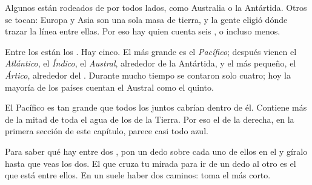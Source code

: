 \begin{remark}\label{rem:g3:continents-and-oceans:where}
Algunos  están rodeados de  por todos lados, como Australia o
la Antártida. Otros se tocan: Europa y Asia son una sola masa de tierra, y
la gente eligió dónde trazar la línea entre ellas. Por eso hay quien cuenta
seis , o incluso menos.
\end{remark}

Entre los  están los . Hay cinco. El más grande es el
\emph{ Pacífico}; después vienen el \emph{ Atlántico}, el
\emph{ Índico}, el \emph{ Austral}, alrededor de la Antártida,
y el más pequeño, el \emph{ Ártico}, alrededor del . Durante
mucho tiempo se contaron solo cuatro; hoy la mayoría de los países cuentan
el  Austral como el quinto.

\begin{example}\label{ex:g3:continents-and-oceans:pacific}
El  Pacífico es tan grande que todos los  juntos cabrían
dentro de él. Contiene más de la mitad de toda el agua de los  de la
Tierra. Por eso el  de la derecha, en la primera sección de este
capítulo, parece casi todo azul.
\end{example}

\begin{method}\label{met:g3:continents-and-oceans:between}
Para saber qué  hay entre dos , pon un dedo sobre cada uno
de ellos en el  y gíralo hasta que veas los dos. El 
que cruza tu mirada para ir de un dedo al otro es el que está entre ellos.
En un  suele haber dos caminos: toma el más corto.
\end{method}

